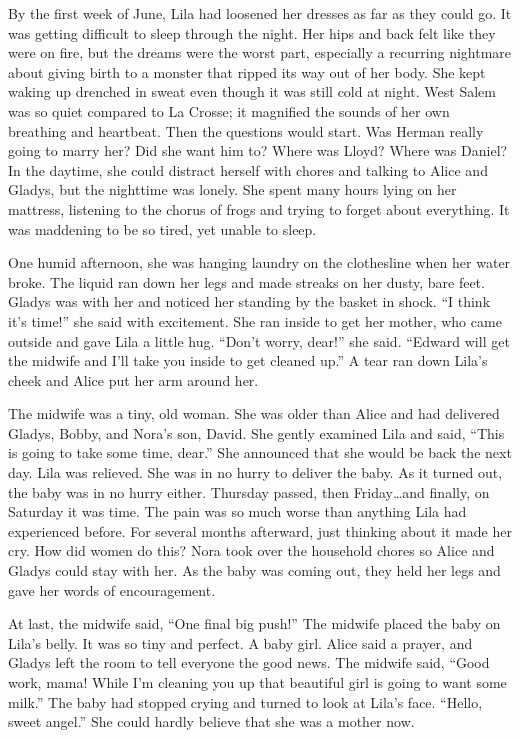 \documentclass[
  letterpaper,
]{book}
\begin{document}
By the first week of June, Lila had loosened her dresses as far as they
could go. It was getting difficult to sleep through the night. Her hips
and back felt like they were on fire, but the dreams were the worst
part, especially a recurring nightmare about giving birth to a monster
that ripped its way out of her body. She kept waking up drenched in
sweat even though it was still cold at night. West Salem was so quiet
compared to La Crosse; it magnified the sounds of her own breathing and
heartbeat. Then the questions would start. Was Herman really going to
marry her? Did she want him to? Where was Lloyd? Where was Daniel? In
the daytime, she could distract herself with chores and talking to Alice
and Gladys, but the nighttime was lonely. She spent many hours lying on
her mattress, listening to the chorus of frogs and trying to forget
about everything. It was maddening to be so tired, yet unable to sleep.

One humid afternoon, she was hanging laundry on the clothesline when her
water broke. The liquid ran down her legs and made streaks on her dusty,
bare feet. Gladys was with her and noticed her standing by the basket in
shock. ``I think it's time!'' she said with excitement. She ran inside
to get her mother, who came outside and gave Lila a little hug. ``Don't
worry, dear!'' she said. ``Edward will get the midwife and I'll take you
inside to get cleaned up.'' A tear ran down Lila's cheek and Alice put
her arm around her.

The midwife was a tiny, old woman. She was older than Alice and had
delivered Gladys, Bobby, and Nora's son, David. She gently examined Lila
and said, ``This is going to take some time, dear.'' She announced that
she would be back the next day. Lila was relieved. She was in no hurry
to deliver the baby. As it turned out, the baby was in no hurry either.
Thursday passed, then Friday\ldots and finally, on Saturday it was time.
The pain was so much worse than anything Lila had experienced before.
For several months afterward, just thinking about it made her cry. How
did women do this? Nora took over the household chores so Alice and
Gladys could stay with her. As the baby was coming out, they held her
legs and gave her words of encouragement.

At last, the midwife said, ``One final big push!'' The midwife placed
the baby on Lila's belly. It was so tiny and perfect. A baby girl. Alice
said a prayer, and Gladys left the room to tell everyone the good news.
The midwife said, ``Good work, mama! While I'm cleaning you up that
beautiful girl is going to want some milk.'' The baby had stopped crying
and turned to look at Lila's face. ``Hello, sweet angel.'' She could
hardly believe that she was a mother now.
\end{document}

